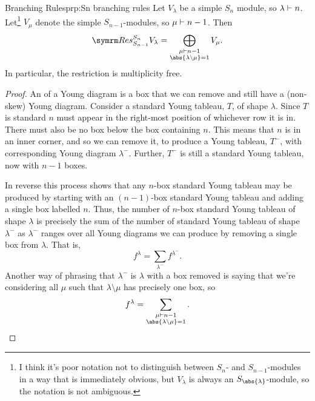 \begin{prp}{Branching Rules}{prp:Sn branching rules}
    Let \(V_\lambda\) be a simple \(S_n\) module, so \(\lambda \vdash n\).
    Let\footnote{I think it's poor notation not to distinguish between \(S_n\)- and \(S_{n-1}\)-modules in a way that is immediately obvious, but \(V_\lambda\) is always an \(S_{\abs{\lambda}}\)-module, so the notation is not ambiguous.} \(V_\mu\) denote the simple \(S_{n-1}\)-modules, so \(\mu \vdash n-1\).
    Then
    \begin{equation}
        \Res^{S_n}_{S_{n-1}} V_\lambda = \bigoplus_{\substack{\mu \partition n-1\\ \abs{\lambda\setminus \mu} = 1}} V_\mu.
    \end{equation}
    In particular, the restriction is multiplicity free.
    \begin{proof}
        An  of a Young diagram is a box that we can remove and still have a (non-skew) Young diagram.
        Consider a standard Young tableau, \(T\), of shape \(\lambda\).
        Since \(T\) is standard \(n\) must appear in the right-most position of whichever row it is in.
        There must also be no box below the box containing \(n\).
        This means that \(n\) is in an inner corner, and so we can remove it, to produce a Young tableau, \(T^-\), with corresponding Young diagram \(\lambda^-\).
        Further, \(T^-\) is still a standard Young tableau, now with \(n-1\) boxes.
        
        In reverse this process shows that any \(n\)-box standard Young tableau may be produced by starting with an \((n-1)\)-box standard Young tableau and adding a single box labelled \(n\).
        Thus, the number of \(n\)-box standard Young tableau of shape \(\lambda\) is precisely the sum of the number of standard Young tableau of shape \(\lambda^-\) as \(\lambda^-\) ranges over all Young diagrams we can produce by removing a single box from \(\lambda\).
        That is,
        \begin{equation}
            f^\lambda = \sum_{\lambda^-} f^{\lambda^-}.
        \end{equation}
        Another way of phrasing that \(\lambda^-\) is \(\lambda\) with a box removed is saying that we're considering all \(\mu\) such that \(\lambda\setminus \mu\) has precisely one box, so
        \begin{equation}
            \label{eqn:number of standard lambda tableaux from number of standard tableaux of one box fewer}
            f^\lambda = \sum_{\substack{\mu \partition n-1\\ \abs{\lambda\setminus \mu} = 1}}.
        \end{equation}
        

\end{proof}
\end{prp}
